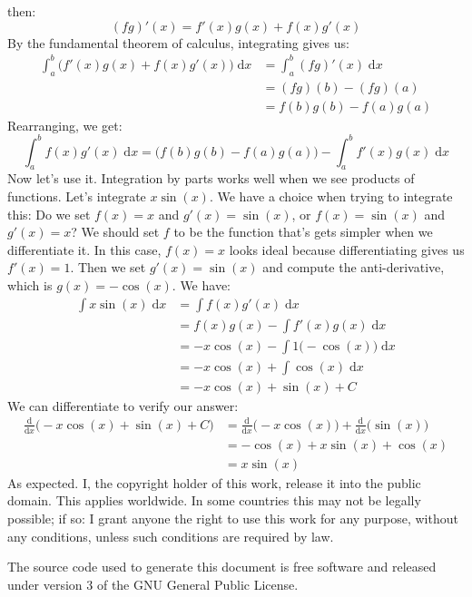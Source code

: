 \documentclass{article}
\begin{document}
    then:
    \begin{equation}
        (fg)'(x)=f'(x)g(x)+f(x)g'(x)
    \end{equation}
    By the fundamental theorem of calculus, integrating gives us:
    \begin{align}
        \int_{a}^{b}\Big(f'(x)g(x)+f(x)g'(x)\Big)\;\textrm{d}x
            &=\int_{a}^{b}(fg)'(x)\;\textrm{d}x\\
            &=(fg)(b)-(fg)(a)\\
            &=f(b)g(b)-f(a)g(a)
    \end{align}
    Rearranging, we get:
    \begin{equation}
        \int_{a}^{b}f(x)g'(x)\;\textrm{d}x
            =\Big(f(b)g(b)-f(a)g(a)\Big)-\int_{a}^{b}f'(x)g(x)\;\textrm{d}x
    \end{equation}
    Now let's use it. Integration by parts works well when we see products of
    functions. Let's integrate $x\sin(x)$. We have a choice when trying to
    integrate this: Do we set $f(x)=x$ and $g'(x)=\sin(x)$, or
    $f(x)=\sin(x)$ and $g'(x)=x$? We should set $f$ to be the function that's
    gets simpler when we differentiate it. In this case, $f(x)=x$ looks ideal
    because differentiating gives us $f'(x)=1$. Then we set $g'(x)=\sin(x)$ and
    compute the anti-derivative, which is $g(x)=-\cos(x)$. We have:
    \begin{align}
        \int{x}\sin(x)\;\textrm{d}x
            &=\int{f}(x)g'(x)\;\textrm{d}x\\
            &=f(x)g(x)-\int{f}'(x)g(x)\;\textrm{d}x\\
            &=-x\cos(x)-\int{1}\big(-\cos(x)\big)\;\textrm{d}x\\
            &=-x\cos(x)+\int\cos(x)\;\textrm{d}x\\
            &=-x\cos(x)+\sin(x)+C
    \end{align}
    We can differentiate to verify our answer:
    \begin{align}
        \frac{\textrm{d}}{\textrm{d}x}\Big(-x\cos(x)+\sin(x)+C\Big)
            &=\frac{\textrm{d}}{\textrm{d}x}\Big(-x\cos(x)\Big)
                +\frac{\textrm{d}}{\textrm{d}x}\Big(\sin(x)\Big)\\
            &=-\cos(x)+x\sin(x)+\cos(x)\\
            &=x\sin(x)
    \end{align}
    As expected.
    \newpage
    I, the copyright holder of this work, release it into the public domain.
    This applies worldwide. In some countries this may not be legally possible;
    if so: I grant anyone the right to use this work for any purpose, without
    any conditions, unless such conditions are required by law.
    \par\hfill\par
    The source code used to generate this document is free software and released
    under version 3 of the GNU General Public License.
\end{document}
